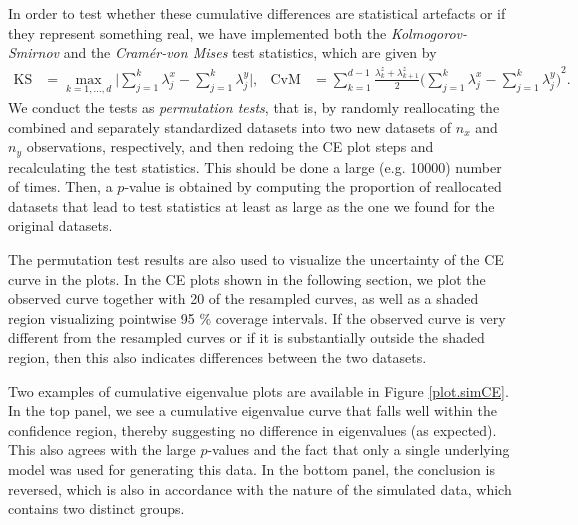 \documentclass[]{interact}
\theoremstyle{plain}%
\theoremstyle{definition}
\theoremstyle{remark}
\begin{document}
In order to test whether these cumulative differences are statistical artefacts or if they represent something real, we have implemented both the \emph{Kolmogorov-Smirnov} and the \emph{Cram\'er-von Mises} test statistics, which are given by
\begin{align*}
\text{KS} &= \max_{k=1,\dotsc,d} \bigg\lvert \sum_{j=1}^k \lambda_{j}^x - \sum_{j=1}^k \lambda_{j}^y \bigg\rvert, &
\text{CvM} &= \sum_{k=1}^{d-1} \frac{\lambda_k^z + \lambda_{k+1}^z}{2} {\bigg( \sum_{j=1}^k \lambda_{j}^x - \sum_{j=1}^k \lambda_{j}^y \bigg)}^2.
\end{align*}
We conduct the tests as \textit{permutation tests}, that is, by randomly reallocating the combined and separately standardized datasets into two new datasets of $n_x$ and $n_y$ observations, respectively, and then redoing the CE plot steps and recalculating the test statistics. This should be done a large (e.g. 10000) number of times. Then, a $p$-value is obtained by computing the proportion of reallocated datasets that lead to %
test statistics at least as large as %
the one we found for the original datasets.

The permutation test results are also used to visualize the uncertainty of the CE curve in the plots. In the CE plots shown in the following section, we plot the observed curve together with 20 of the resampled curves, as well as a shaded region visualizing pointwise 95 \% coverage intervals. If the observed curve is very different from the resampled curves or if it is substantially outside the shaded region, then this also indicates differences between the two datasets.

Two examples of cumulative eigenvalue plots are available in Figure \ref{plot.simCE}. In the top panel, we see a cumulative eigenvalue curve that falls well within the confidence region, thereby suggesting no difference in eigenvalues (as expected). This also agrees with the large $p$-values and the fact that only a single underlying model was used for generating this data. In the bottom panel, the conclusion is reversed, which is also in accordance with the nature of the simulated data, which contains two distinct groups.
\end{document}
